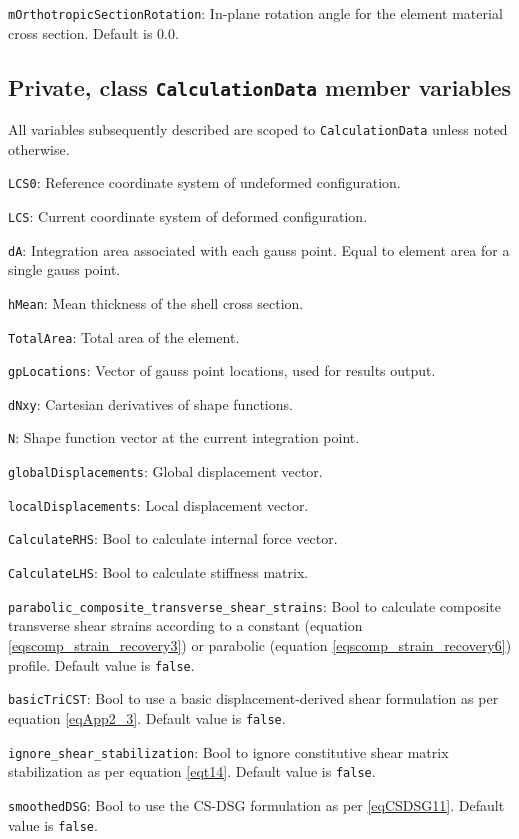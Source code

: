 \texttt{mOrthotropicSectionRotation}: In-plane rotation angle for the element material cross section. Default is 0.0.

\subsection{Private, class \texttt{CalculationData} member variables}
All variables subsequently described are scoped to \texttt{CalculationData} unless noted otherwise.

\texttt{LCS0}: Reference coordinate system of undeformed configuration.

\texttt{LCS}: Current coordinate system of deformed configuration.

\texttt{dA}: Integration area associated with each gauss point. Equal to element area for a single gauss point.

\texttt{hMean}: Mean thickness of the shell cross section.

\texttt{TotalArea}: Total area of the element.

\texttt{gpLocations}: Vector of gauss point locations, used for results output.

\texttt{dNxy}: Cartesian derivatives of shape functions.

\texttt{N}: Shape function vector at the current integration point.

\texttt{globalDisplacements}: Global displacement vector.

\texttt{localDisplacements}: Local displacement vector.

\texttt{CalculateRHS}: Bool to calculate internal force vector.

\texttt{CalculateLHS}: Bool to calculate stiffness matrix.

\texttt{parabolic\_composite\_transverse\_shear\_strains}: Bool to calculate composite transverse shear strains according to a constant (equation \ref{eqscomp_strain_recovery3}) or parabolic (equation \ref{eqscomp_strain_recovery6}) profile. Default value is \texttt{false}.

\texttt{basicTriCST}: Bool to use a basic displacement-derived shear formulation as per equation \ref{eqApp2_3}. Default value is \texttt{false}.

\texttt{ignore\_shear\_stabilization}: Bool to ignore constitutive shear matrix stabilization as per equation \ref{eqt14}. Default value is \texttt{false}.

\texttt{smoothedDSG}: Bool to use the CS-DSG formulation as per \ref{eqCSDSG11}. Default value is \texttt{false}.

